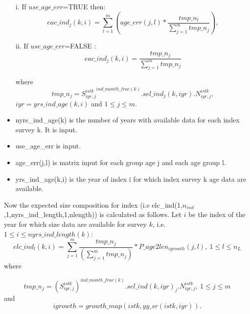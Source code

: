 \documentclass{article}
\begin{document}
\begin{itemize}
        \item [i.] If $use\_age\_err$=TRUE then: 
    \begin{equation}
        eac\_ind_j(k,i)=\sum_{l=1}^m \left(age\_err(j,l)*\dfrac{tmp\_n_l}{\sum_{j=1}^mtmp\_n_j}\right),
    \end{equation}
        \item [ii.] If $use\_age\_err$=FALSE :
        \begin{equation}eac\_ind_j(k,i)=\dfrac{tmp\_n_j}{\sum_{j=1}^mtmp\_n_j}
    \end{equation}

where \begin{equation}
    tmp\_n_j= {S^{istk}_{iyr,j}}^{ind\_month\_frac(k)}.sel\_ind_j(k,iyr).N^{istk}_{iyr,j},
\end{equation}
 $iyr=yrs\_ind\_age(k,i)$ and $1\leq j\leq m$.
    \end{itemize}
\begin{itemize}
    \item nyrs\_ind\_age(k) is the number of years with available data for each  index survey k. It is input. 
    \item use\_age\_err is input.
    \item age\_err(j,l) is matrix input for each group age j and each age group l.
    \item yrs\_ind\_age(k,i) is the year of index i for which index survey k age data are available. 
\end{itemize}


Now the expected size composition for index (i.e elc\_ind(1,$n_{ind}$,1,nyrs\_ind\_length,1,nlength)) is calculated as follows. Let $i$ be the index of the year for which size data are available for survey $k$, i.e.   $1\leq i \leq nyrs\_ind\_length(k)$:
\begin{equation}
    elc\_ind_l(k,i)=\sum_{j=1}^m\dfrac{tmp\_n_j}{\left(\displaystyle\sum_{j=1}^mtmp\_n_j\right)}*P\_age2len_{igrowth}(j,l), \ 1\leq l \leq n_L
\end{equation}
where

\begin{equation}
    tmp\_n_j= {\left(S^{istk}_{iyr,j}\right)}^{ind\_month\_frac(k)}.sel\_ind(k,iyr)_j.N^{istk}_{iyr,j}, \ 1\leq j \leq m
\end{equation}
and
\begin{equation}
    igrowth=growth\_map(istk,yy\_sr(istk,iyr)).    
\end{equation}
\end{document}
